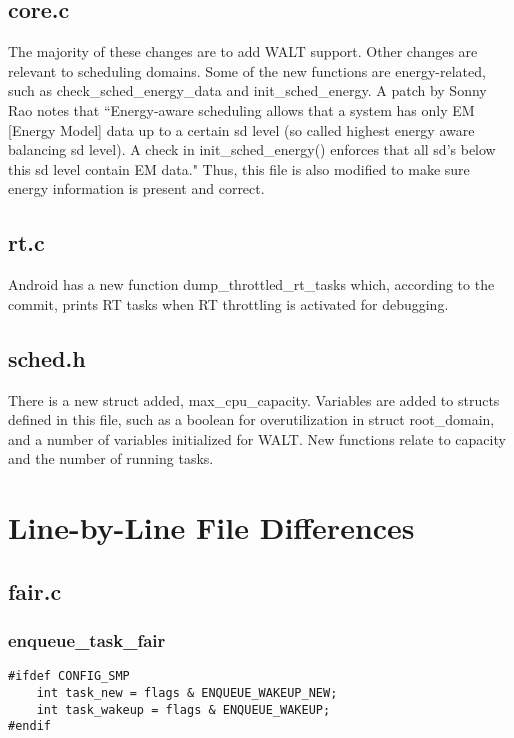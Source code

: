 \documentclass{article}
\begin{document}
\subsection{core.c}

The majority of these changes are to add WALT support. Other changes are relevant to scheduling domains. Some of the new functions are energy-related, such as check\_sched\_energy\_data and init\_sched\_energy. A patch by Sonny Rao notes that ``Energy-aware scheduling allows that a system has only EM [Energy Model] data up to a certain sd level (so called highest energy aware balancing sd level). A check in init\_sched\_energy() enforces that all sd's below this sd level contain EM data." Thus, this file is also modified to make sure energy information is present and correct.

\subsection{rt.c}

Android has a new function dump\_throttled\_rt\_tasks which, according to the commit, prints RT tasks when RT throttling is activated for debugging.

\subsection{sched.h}

There is a new struct added, max\_cpu\_capacity. Variables are added to structs defined in this file, such as a boolean for overutilization in struct root\_domain, and a number of variables initialized for WALT. New functions relate to capacity and the number of running tasks.



\section{Line-by-Line File Differences}

\subsection{fair.c}

\subsubsection{enqueue\_task\_fair}
\begin{verbatim}
#ifdef CONFIG_SMP
    int task_new = flags & ENQUEUE_WAKEUP_NEW;
    int task_wakeup = flags & ENQUEUE_WAKEUP;
#endif
\end{verbatim}
\end{document}
